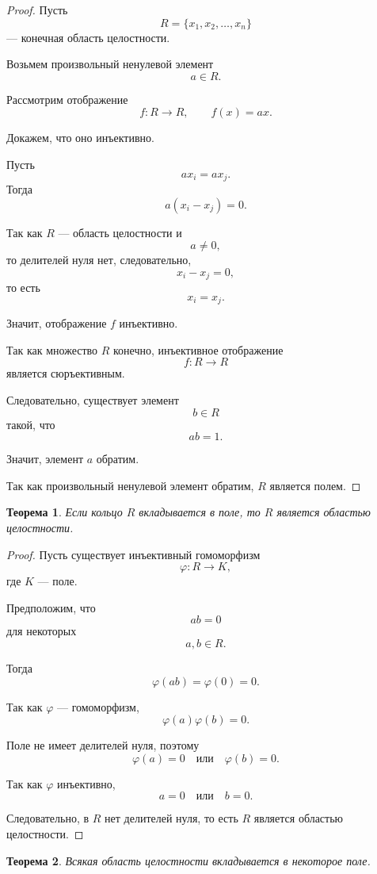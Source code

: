 \documentclass[12pt, a4paper]{article}
\newtheorem{theorem}{Теорема}
\theoremstyle{definition}
\theoremstyle{remark}
\begin{document}
\begin{proof}
	Пусть
	\[
	R=\{x_1,x_2,\dots,x_n\}
	\]
	--- конечная область целостности.
	
	Возьмем произвольный ненулевой элемент
	\[
	a\in R.
	\]
	
	Рассмотрим отображение
	\[
	f:R\to R,
	\qquad
	f(x)=ax.
	\]
	
	Докажем, что оно инъективно.
	
	Пусть
	\[
	ax_i=ax_j.
	\]
	Тогда
	\[
	a(x_i-x_j)=0.
	\]
	
	Так как $R$ --- область целостности и
	\[
	a\ne0,
	\]
	то делителей нуля нет, следовательно,
	\[
	x_i-x_j=0,
	\]
	то есть
	\[
	x_i=x_j.
	\]
	
	Значит, отображение $f$ инъективно.
	
	Так как множество $R$ конечно, инъективное отображение
	\[
	f:R\to R
	\]
	является сюръективным.
	
	Следовательно, существует элемент
	\[
	b\in R
	\]
	такой, что
	\[
	ab=1.
	\]
	
	Значит, элемент $a$ обратим.
	
	Так как произвольный ненулевой элемент обратим,
	$R$ является полем.
\end{proof}

\begin{theorem}
	Если кольцо $R$ вкладывается в поле, то $R$ является областью целостности.
\end{theorem}

\begin{proof}
	Пусть существует инъективный гомоморфизм
	\[
	\varphi:R\to K,
	\]
	где $K$ --- поле.
	
	Предположим, что
	\[
	ab=0
	\]
	для некоторых
	\[
	a,b\in R.
	\]
	
	Тогда
	\[
	\varphi(ab)=\varphi(0)=0.
	\]
	
	Так как $\varphi$ --- гомоморфизм,
	\[
	\varphi(a)\varphi(b)=0.
	\]
	
	Поле не имеет делителей нуля, поэтому
	\[
	\varphi(a)=0
	\quad \text{или} \quad
	\varphi(b)=0.
	\]
	
	Так как $\varphi$ инъективно,
	\[
	a=0
	\quad \text{или} \quad
	b=0.
	\]
	
	Следовательно, в $R$ нет делителей нуля, то есть
	$R$ является областью целостности.
\end{proof}

\begin{theorem}
	Всякая область целостности вкладывается в некоторое поле.
\end{theorem}
\end{document}
